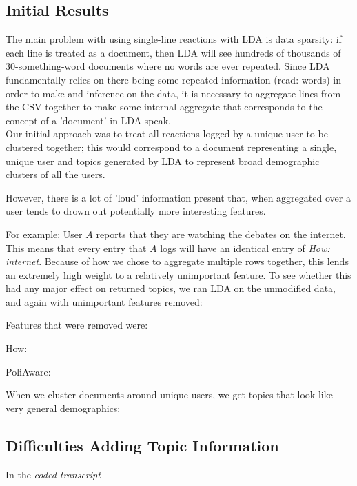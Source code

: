 \subsection{Initial Results}
The main problem with using single-line reactions with LDA is data sparsity: if each line is treated as a document, then LDA will see hundreds of thousands of 30-something-word documents where no words are ever repeated. Since LDA fundamentally relies on there being some repeated information (read: words) in order to make and inference on the data, it is necessary to aggregate lines from the CSV together to make some internal aggregate that corresponds to the concept of a 'document' in LDA-speak.\\

Our initial approach was to treat all reactions logged by a unique user to be clustered together; this would correspond to a document representing a single, unique user and topics generated by LDA to represent broad demographic clusters of all the users.

However, there is a lot of 'loud' information present that, when aggregated over a user tends to drown out potentially more interesting features.

For example: User $A$ reports that they are watching the debates on the internet. This means that every entry that $A$ logs will have an identical entry of \emph{How: internet}. Because of how we chose to aggregate multiple rows together, this lends an extremely high weight to a relatively unimportant feature. To see whether this had any major effect on returned topics, we ran LDA on the unmodified data, and again with unimportant features removed:



Features that were removed were:
\begin{list}
\item How:
\item PoliAware:
\item 
\end{list}



When we cluster documents around unique users, we get topics that look like very general demographics:\\




\subsection{Difficulties Adding Topic Information}


In the \emph{coded transcript}

